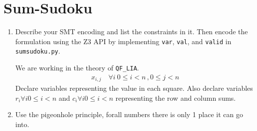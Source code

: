 \section{Sum-Sudoku}
\begin{enumerate}[label=(\alph*)]
  \item {\color{blue}Describe your SMT encoding and list the constraints in it. Then encode the formulation using the Z3 API by implementing \texttt{var}, \texttt{val}, and \texttt{valid} in \texttt{sumsudoku.py}.}

    We are working in the theory of \texttt{QF\_LIA}.
    \begin{align*}
      x_{i,j} \quad \forall i \: 0 \leq i< n \,, 0 \leq j < n
    \end{align*}
    Declare variables representing the value in each square. Also declare variables $r_i \forall i 0 \leq i < n$ and $c_i \forall i 0 \leq i < n$ representing the row and column sums.

  \item Use the pigeonhole principle, forall numbers there is only 1 place it can go into.
\end{enumerate}

